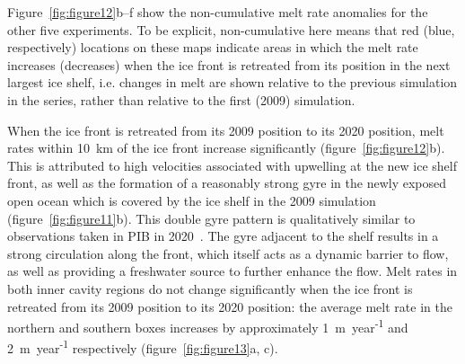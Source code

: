 \documentclass[draft]{agujournal2019}
\begin{document}
Figure~\ref{fig:figure12}b--f show the non-cumulative melt rate anomalies for the other five experiments. To be explicit, non-cumulative here means that red (blue, respectively) locations on these maps indicate areas in which the melt rate increases (decreases) when the ice front is retreated from its position in the next largest ice shelf, i.e. changes in melt are shown relative to the previous simulation in the series, rather than relative to the first (2009) simulation.

When the ice front is retreated from its 2009 position to its 2020 position, melt rates within 10~km of the ice front increase significantly (figure~\ref{fig:figure12}b). This is attributed to high velocities associated with upwelling at the new ice shelf front, as well as the formation of a reasonably strong gyre in the newly exposed open ocean which is covered by the ice shelf in the 2009 simulation (figure~\ref{fig:figure11}b). This double gyre pattern is qualitatively similar to observations taken in PIB in 2020~\cite{Yoon2021}. The gyre adjacent to the shelf results in a strong circulation along the front, which itself acts as a dynamic barrier to flow, as well as providing a freshwater source to further enhance the flow. Melt rates in both inner cavity regions do not change significantly when the ice front is retreated from its 2009 position to its 2020 position: the average melt rate in the northern and southern boxes increases by approximately 1~m~year\textsuperscript{-1} and 2~m~year\textsuperscript{-1} respectively (figure~\ref{fig:figure13}a, c).
\end{document}
